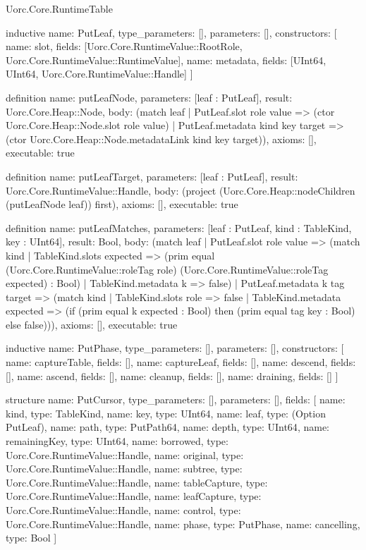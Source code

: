 \begin{lexlean}{Uorc.Core.RuntimeTable}
\begin{semanticmodule}
inductive{
  name: PutLeaf,
  type_parameters: [],
  parameters: [],
  constructors: [
    {name: slot, fields: [Uorc.Core.RuntimeValue::RootRole, Uorc.Core.RuntimeValue::RuntimeValue]},
    {name: metadata, fields: [UInt64, UInt64, Uorc.Core.RuntimeValue::Handle]}
  ]
}

definition{
  name: putLeafNode,
  parameters: [leaf : PutLeaf],
  result: Uorc.Core.Heap::Node,
  body: (match leaf
    | PutLeaf.slot role value => (ctor Uorc.Core.Heap::Node.slot role value)
    | PutLeaf.metadata kind key target => (ctor Uorc.Core.Heap::Node.metadataLink kind key target)),
  axioms: [],
  executable: true
}

definition{
  name: putLeafTarget,
  parameters: [leaf : PutLeaf],
  result: Uorc.Core.RuntimeValue::Handle,
  body: (project (Uorc.Core.Heap::nodeChildren (putLeafNode leaf)) first),
  axioms: [],
  executable: true
}

definition{
  name: putLeafMatches,
  parameters: [leaf : PutLeaf, kind : TableKind, key : UInt64],
  result: Bool,
  body: (match leaf
    | PutLeaf.slot role value => (match kind
      | TableKind.slots expected => (prim equal (Uorc.Core.RuntimeValue::roleTag role) (Uorc.Core.RuntimeValue::roleTag expected) : Bool)
      | TableKind.metadata k => false)
    | PutLeaf.metadata k tag target => (match kind
      | TableKind.slots role => false
      | TableKind.metadata expected => (if (prim equal k expected : Bool) then (prim equal tag key : Bool) else false))),
  axioms: [],
  executable: true
}

inductive{
  name: PutPhase,
  type_parameters: [],
  parameters: [],
  constructors: [
    {name: captureTable, fields: []},
    {name: captureLeaf, fields: []},
    {name: descend, fields: []},
    {name: ascend, fields: []},
    {name: cleanup, fields: []},
    {name: draining, fields: []}
  ]
}

structure{
  name: PutCursor,
  type_parameters: [],
  parameters: [],
  fields: [
    {name: kind, type: TableKind},
    {name: key, type: UInt64},
    {name: leaf, type: (Option PutLeaf)},
    {name: path, type: PutPath64},
    {name: depth, type: UInt64},
    {name: remainingKey, type: UInt64},
    {name: borrowed, type: Uorc.Core.RuntimeValue::Handle},
    {name: original, type: Uorc.Core.RuntimeValue::Handle},
    {name: subtree, type: Uorc.Core.RuntimeValue::Handle},
    {name: tableCapture, type: Uorc.Core.RuntimeValue::Handle},
    {name: leafCapture, type: Uorc.Core.RuntimeValue::Handle},
    {name: control, type: Uorc.Core.RuntimeValue::Handle},
    {name: phase, type: PutPhase},
    {name: cancelling, type: Bool}
  ]
}


\end{semanticmodule}
\end{lexlean}
